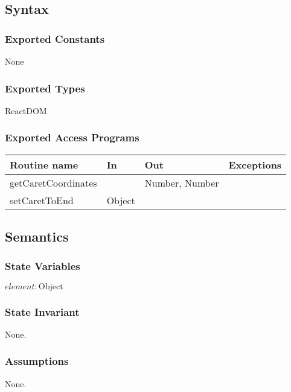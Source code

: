 \documentclass[12pt, titlepage]{article}
\begin{document}
\subsection{Syntax}

\subsubsection{Exported Constants}

None

\subsubsection{Exported Types}

ReactDOM

\subsubsection{Exported Access Programs}

\begin{tabular}{| l | l | l | l |}
  \hline
  \textbf{Routine name} & \textbf{In} & \textbf{Out} & \textbf{Exceptions}\\
  \hline
  getCaretCoordinates & ~ & Number, Number & ~\\
  \hline
  setCaretToEnd & Object & ~ & ~\\
  \hline
\end{tabular}

\subsection{Semantics}

\subsubsection{State Variables}

$\mathit{element}: \text{Object}$\\

\subsubsection{State Invariant}

None.

\subsubsection{Assumptions}

None.
\end{document}
